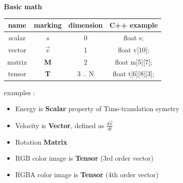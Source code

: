 \documentclass[xcolor=dvipsnames]{beamer}
\begin{document}
\begin{frame}{\bf Basic math}


\begin{table}[]
\begin{tabular}{|c|c|c|c|}
\hline
\textbf{name} & \textbf{marking}            & \textbf{dimension} & \textbf{C++ example}          \\ \hline
scalar        & $s$                         & 0                  & float s;                      \\ \hline
vector        & $\vec{v}$                   & 1                  & float v{[}10{]};              \\ \hline
matrix        & \bf{M} & 2                  & float m{[}5{]}{[}7{]};        \\ \hline
tensor        & \bf{T} & 3 .. N             & float t{[}6{]}{[}8{]}{[}3{]}; \\ \hline
\end{tabular}
\end{table}

examples :

\begin{itemize}

\item Energy is {\bf Scalar} property of Time-translation symetry
\item Velocity is {\bf Vector}, defined as $\frac{d\vec{x}}{dt}$
\item Rotation {\bf Matrix}
\item RGB color image is {\bf Tensor} (3rd order vector)
\item RGBA color image is {\bf Tensor} (4th order vector)

\end{itemize}
\end{frame}
\end{document}
